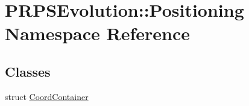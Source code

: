 \hypertarget{namespace_p_r_p_s_evolution_1_1_positioning}{\section{\-P\-R\-P\-S\-Evolution\-:\-:\-Positioning \-Namespace \-Reference}
\label{namespace_p_r_p_s_evolution_1_1_positioning}
}
\subsection*{\-Classes}
\begin{DoxyCompactItemize}
\item 
struct \hyperlink{struct_p_r_p_s_evolution_1_1_positioning_1_1_coord_container}{\-Coord\-Container}
\end{DoxyCompactItemize}
